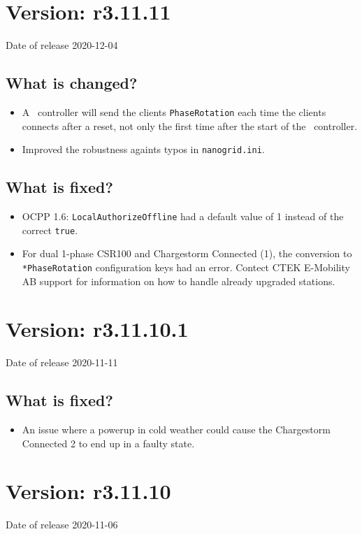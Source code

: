 \documentclass{scrartcl}
\begin{document}
\section{Version: r3.11.11}
Date of release 2020-12-04
\subsection*{What is changed?}
\begin{itemize}
\item A \nanogrid\ controller will send the clients \verb|PhaseRotation| each
  time the clients connects after a reset, not only the first time after the
  start of the \nanogrid\ controller.
\item Improved the robustness againts typos in \verb|nanogrid.ini|.
\end{itemize}
\subsection*{What is fixed?}
\begin{itemize}
\item OCPP 1.6: \verb|LocalAuthorizeOffline| had a default value of 1 instead
  of the correct \verb|true|.
\item For dual 1-phase CSR100 and Chargestorm Connected (1), the conversion to
  \verb|*PhaseRotation| configuration keys had an error. Contect CTEK
  E-Mobility AB support for information on how to handle already upgraded stations.
\end{itemize}

\section{Version: r3.11.10.1}
Date of release 2020-11-11
\subsection*{What is fixed?}
\begin{itemize}
\item An issue where a powerup in cold weather could cause the Chargestorm
  Connected 2 to end up in a faulty state.
\end{itemize}

\section{Version: r3.11.10}
Date of release 2020-11-06
\end{document}
